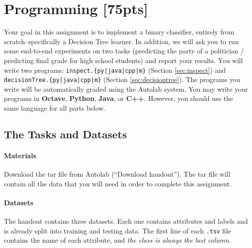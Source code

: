 \documentclass[11pt]{article}
\numberwithin{equation}{section} %
\numberwithin{figure}{section} %
\numberwithin{table}{section} %
\begin{document}
\newpage
\section{Programming [75pts]}
\label{sec:programming}

Your goal in this assignment is to implement a binary classifier, entirely from scratch--specifically a Decision Tree learner. In addition, we will ask you to run some end-to-end experiments on two tasks (predicting the party of a politician / predicting final grade for high school students) and report your results.
%
You will write two programs: \texttt{inspect.\{py|java|cpp|m\}} (Section \ref{sec:inspect}) and \texttt{decisionTree.\{py|java|cpp|m\}} (Section \ref{sec:decisiontree}). The programs you write will be automatically graded using the Autolab system. You may write your programs in \textbf{Octave}, \textbf{Python}, \textbf{Java}, or \textbf{C++}. However, you should use the same language for all parts below.

\subsection{The Tasks and Datasets}
\label{sec:data}

\paragraph{Materials} Download the tar file from Autolab (``Download
  handout''). The tar file will contain all the data that you will need
  in order to complete this assignment.

\paragraph{Datasets}

The handout contains three datasets. Each one contains attributes and labels and is already split into training and testing data. The first line of each \lstinline{.tsv} file contains the name of each attribute, and \emph{the class is always the last column}.
\end{document}
